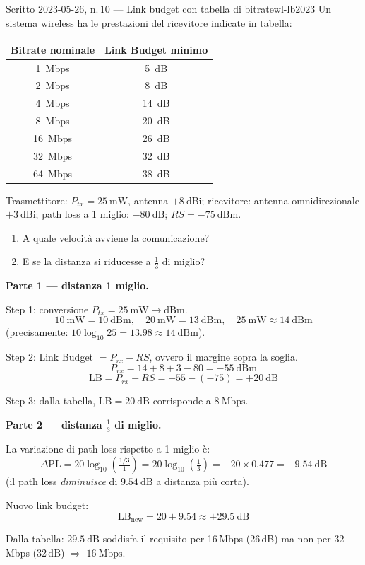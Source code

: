 \documentclass{report}
\begin{document}
\begin{Exercise}{Scritto 2023-05-26, n.\,10 --- Link budget con tabella di bitrate}{wl-lb2023}
Un sistema wireless ha le prestazioni del ricevitore indicate in tabella:
\begin{center}
\begin{tabular}{cc}
\hline
Bitrate nominale & Link Budget minimo \\
\hline
1~Mbps  &  5~dB \\
2~Mbps  &  8~dB \\
4~Mbps  & 14~dB \\
8~Mbps  & 20~dB \\
16~Mbps & 26~dB \\
32~Mbps & 32~dB \\
64~Mbps & 38~dB \\
\hline
\end{tabular}
\end{center}
Trasmettitore: $P_{tx}=25\ \text{mW}$, antenna $+8\ \text{dBi}$; ricevitore:
antenna omnidirezionale $+3\ \text{dBi}$; path loss a 1 miglio: $-80\ \text{dB}$;
$RS = -75\ \text{dBm}$.
\begin{enumerate}
  \item A quale velocità avviene la comunicazione?
  \item E se la distanza si riducesse a $\tfrac{1}{3}$ di miglio?
\end{enumerate}
\end{Exercise}

\begin{solution}
\textbf{Parte 1 --- distanza 1 miglio.}

Step 1: conversione $P_{tx}=25\ \text{mW} \to \text{dBm}$.
\[
  10\ \text{mW} = 10\ \text{dBm}, \quad
  20\ \text{mW} = 13\ \text{dBm}, \quad
  25\ \text{mW} \approx 14\ \text{dBm}
\]
(precisamente: $10\log_{10}25 = 13.98 \approx 14\ \text{dBm}$).

Step 2: Link Budget $= P_{rx} - RS$, ovvero il margine sopra la soglia.
\[
  P_{rx} = 14 + 8 + 3 - 80 = -55\ \text{dBm}
\]
\[
  \text{LB} = P_{rx} - RS = -55 - (-75) = +20\ \text{dB}
\]

Step 3: dalla tabella, $\text{LB}=20\ \text{dB}$ corrisponde a $\boxed{8\ \text{Mbps}}$.

\medskip
\textbf{Parte 2 --- distanza $\tfrac{1}{3}$ di miglio.}

La variazione di path loss rispetto a 1 miglio è:
\[
  \Delta\text{PL} = 20\log_{10}\!\left(\tfrac{1/3}{1}\right) = 20\log_{10}\!\left(\tfrac{1}{3}\right)
  = -20 \times 0.477 = -9.54\ \text{dB}
\]
(il path loss \emph{diminuisce} di $9.54\ \text{dB}$ a distanza più corta).

Nuovo link budget:
\[
  \text{LB}_{\text{new}} = 20 + 9.54 \approx +29.5\ \text{dB}
\]

Dalla tabella: $29.5\ \text{dB}$ soddisfa il requisito per 16\,Mbps (26\,dB)
ma non per 32\,Mbps (32\,dB) $\Rightarrow$ $\boxed{16\ \text{Mbps}}$.
\end{solution}
\end{document}
